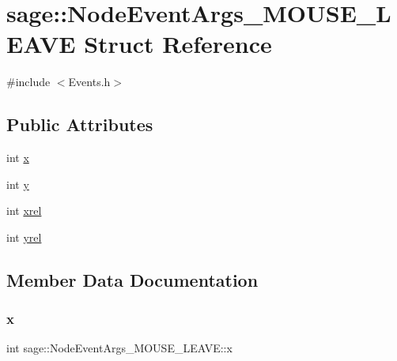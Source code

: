 \hypertarget{structsage_1_1NodeEventArgs__MOUSE__LEAVE}{}\section{sage\+::Node\+Event\+Args\+\_\+\+M\+O\+U\+S\+E\+\_\+\+L\+E\+A\+VE Struct Reference}
\label{structsage_1_1NodeEventArgs__MOUSE__LEAVE}


{\ttfamily \#include $<$Events.\+h$>$}

\subsection*{Public Attributes}
\begin{DoxyCompactItemize}
\item 
int \mbox{\hyperlink{structsage_1_1NodeEventArgs__MOUSE__LEAVE_a4a8f649df16fecb7289c5be2d18ab455}{x}}
\item 
int \mbox{\hyperlink{structsage_1_1NodeEventArgs__MOUSE__LEAVE_a82964c48dc5ff5bc056acc519063631d}{y}}
\item 
int \mbox{\hyperlink{structsage_1_1NodeEventArgs__MOUSE__LEAVE_a7e0d2f3b59544fe57693c8d176c012c6}{xrel}}
\item 
int \mbox{\hyperlink{structsage_1_1NodeEventArgs__MOUSE__LEAVE_a45b0fb3084854a12e889836e10c9ffd6}{yrel}}
\end{DoxyCompactItemize}


\subsection{Member Data Documentation}
\mbox{\label{structsage_1_1NodeEventArgs__MOUSE__LEAVE_a4a8f649df16fecb7289c5be2d18ab455}} 
\subsubsection{\texorpdfstring{x}{x}}
{\footnotesize\ttfamily int sage\+::\+Node\+Event\+Args\+\_\+\+M\+O\+U\+S\+E\+\_\+\+L\+E\+A\+V\+E\+::x}

\mbox{\label{structsage_1_1NodeEventArgs__MOUSE__LEAVE_a7e0d2f3b59544fe57693c8d176c012c6}} 
